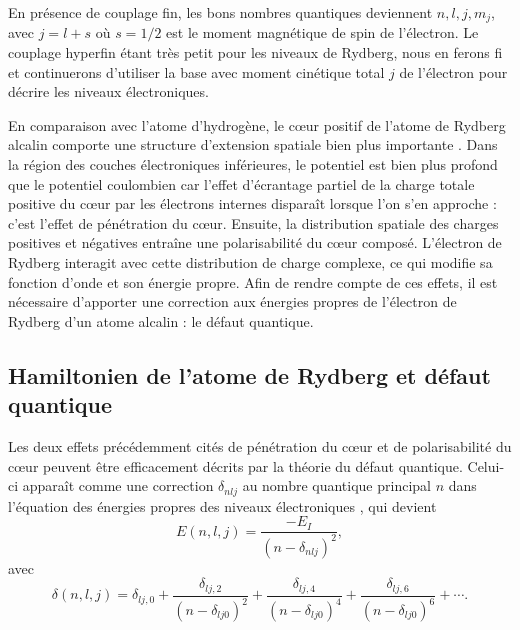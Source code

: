 En présence de couplage fin, les bons nombres quantiques deviennent $n,l,j,m_j$, avec $j=l+s$ où $s=1/2$ est le moment magnétique de spin de l'électron. Le couplage hyperfin étant très petit pour les niveaux de Rydberg, nous en ferons fi et continuerons d'utiliser la base avec moment cinétique total $j$ de l'électron pour décrire les niveaux électroniques.

En comparaison avec l'atome d'hydrogène, le c\oe ur positif de l'atome de Rydberg alcalin comporte une structure d'extension spatiale bien plus importante \cite{TXT_GALLAGHER}.
Dans la région des couches électroniques inférieures, le potentiel est bien plus profond que le potentiel coulombien car l'effet d'écrantage partiel de la charge totale positive du c\oe ur par les électrons internes disparaît lorsque l'on s'en approche : c'est l'effet de pénétration du c\oe ur.
Ensuite, la distribution spatiale des charges positives et négatives entraîne une polarisabilité du c\oe ur composé.
L'électron de Rydberg interagit avec cette distribution de charge complexe, ce qui modifie sa fonction d'onde et son énergie propre.
Afin de rendre compte de ces effets, il est nécessaire d'apporter une correction aux énergies propres de l'électron de Rydberg d'un atome alcalin : le défaut quantique.

	\subsection{Hamiltonien de l'atome de Rydberg et défaut quantique}
\noindent Les deux effets précédemment cités de pénétration du c\oe ur et de polarisabilité du c\oe ur peuvent être efficacement décrits par la théorie du défaut quantique. Celui-ci apparaît comme une correction $\delta_{nlj}$ au nombre quantique principal $n$ dans l'équation des énergies propres des niveaux électroniques \cite{TXT_GALLAGHER}, qui devient
\begin{equation}\label{eq:E_I_delta}
E(n,l,j) = \frac{- E_I}{(n-\delta_{nlj})^2} ,
\end{equation}
avec 
\begin{equation}\label{eq:deltanlj}
\delta(n,l,j)=\delta_{lj,0} + \frac{\delta_{lj,2}}{(n-\delta_{lj0})^2} + \frac{\delta_{lj,4}}{(n-\delta_{lj0})^4} + \frac{\delta_{lj,6}}{(n-\delta_{lj0})^6} + \cdots .
\end{equation}

